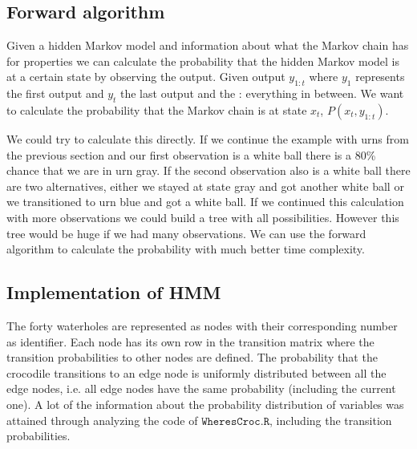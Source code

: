 \documentclass[12pt, a4paper]{article}
\begin{document}
\subsection{Forward algorithm}

Given a hidden Markov model and information about what the Markov chain has for properties we can calculate the probability that the hidden Markov model is at a certain state by observing the output. Given output $y_{1:t}$ where $y_1$ represents the first output and $y_t$ the last output and the : everything in between. We want to calculate the probability that the Markov chain is at state $x_t$, $P(x_t, y_{1:t})$. 

We could try to calculate this directly. If we continue the example with urns from the previous section and our first observation is a white ball there is a 80\% chance that we are in urn gray. If the second observation also is a white ball there are two alternatives, either we stayed at state gray and got another white ball or we transitioned to urn blue and got a white ball. If we continued this calculation with more observations we could build a tree with all possibilities. However this tree would be huge if we had many observations. We can use the forward algorithm to calculate the probability with much better time complexity. 



\subsection{Implementation of HMM}\label{sec:implementation}

The forty waterholes are represented as nodes with their corresponding number as identifier. Each node has its own row in the transition matrix where the transition probabilities to other nodes are defined. The probability that the crocodile transitions to an edge node is uniformly distributed between all the edge nodes, i.e. all edge nodes have the same probability (including the current one). A lot of the information about the probability distribution of variables was attained through analyzing the code of $ \mathtt{WheresCroc.R}$, including the transition probabilities.
\end{document}
